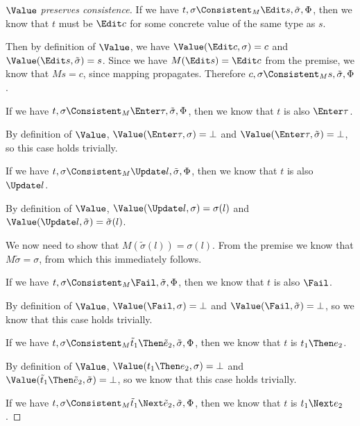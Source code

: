\begin{proof}[$\Value$ preserves consistence]

    {
    If we have $t,\sigma\Consistent_M\Edit s,\tilde{\sigma},\Phi$, then we know that $t$ must be $\Edit c$ for some concrete value of the same type as $s$.

    Then by definition of $\Value$, we have $\Value(\Edit c,\sigma)=c$ and $\Value(\Edit s,\tilde{\sigma})=s$.
    Since we have $M(\Edit s)=\Edit c$ from the premise, we know that $M s = c$, since mapping propagates.
    Therefore $c,\sigma\Consistent_M s,\tilde{\sigma},\Phi$.
    }

    {
    If we have $t,\sigma\Consistent_M\Enter \tau,\tilde{\sigma},\Phi$, then we know that $t$ is also $\Enter\tau$.

    By definition of $\Value$, $\Value(\Enter \tau,\sigma)=\bot$ and $\Value(\Enter\tau,\tilde{\sigma})=\bot$,
    so this case holds trivially.
    }

    {
    If we have $t,\sigma\Consistent_M\Update l,\tilde{\sigma},\Phi$, then we know that $t$ is also $\Update l$.

    By definition of $\Value$, $\Value(\Update l,\sigma)=\sigma(l)$ and $\Value(\Update l,\tilde{\sigma})=\tilde{\sigma}(l)$.

    We now need to show that $M(\tilde{\sigma}(l))=\sigma(l)$. From the premise we know that $M\tilde{\sigma}=\sigma$, from which this immediately follows.
    }

    {
    If we have $t,\sigma\Consistent_M\Fail,\tilde{\sigma},\Phi$, then we know that $t$ is also $\Fail$.

    By definition of $\Value$, $\Value(\Fail,\sigma)=\bot$ and $\Value(\Fail,\tilde{\sigma})=\bot$, so we know that this case holds trivially.
    }

    {
    If we have $t,\sigma\Consistent_M\tilde{t}_1\Then \tilde{e}_2,\tilde{\sigma},\Phi$, then we know that $t$ is $t_1\Then e_2$.

    By definition of $\Value$, $\Value(t_1\Then e_2,\sigma)=\bot$ and $\Value(\tilde{t}_1\Then \tilde{e}_2,\tilde{\sigma})=\bot$, so we know that this case holds trivially.

    }


    {
    If we have $t,\sigma\Consistent_M\tilde{t}_1\Next \tilde{e}_2,\tilde{\sigma},\Phi$, then we know that $t$ is $t_1\Next e_2$.

}
\end{proof}
